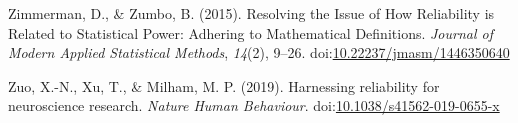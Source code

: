 \documentclass[english,,man]{apa6}
\begin{document}
\leavevmode\hypertarget{ref-Zimmerman2015}{}%
Zimmerman, D., \& Zumbo, B. (2015). Resolving the Issue of How Reliability is Related to Statistical Power: Adhering to Mathematical Definitions. \emph{Journal of Modern Applied Statistical Methods}, \emph{14}(2), 9--26. doi:\href{https://doi.org/10.22237/jmasm/1446350640}{10.22237/jmasm/1446350640}

\leavevmode\hypertarget{ref-zuo_harnessing_2019}{}%
Zuo, X.-N., Xu, T., \& Milham, M. P. (2019). Harnessing reliability for neuroscience research. \emph{Nature Human Behaviour}. doi:\href{https://doi.org/10.1038/s41562-019-0655-x}{10.1038/s41562-019-0655-x}
\end{document}
